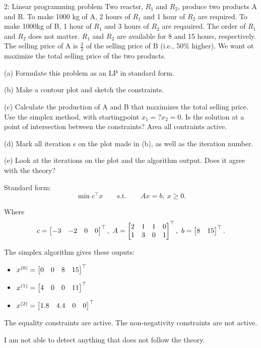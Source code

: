
\begin{problem}{2: Linear programming problem}
  Two reactsr, $R_1$ and $R_2$, produce two products A and B.
  To make 1000 kg of A, 2 hours of $R_1$ and 1 hour of $R_2$ are required. To make 1000kg of B, 1 hour of $R_1$ and 3 hours of 
  $R_2$ are reqauired. The order of $R_1$ and $R_2$ does not matter. $R_1$ and $R_2$ are available for 8 and 15 hours, respectively. 
  The selling price of A is $\frac{3}{2}$ of the selling price of B (i.e., 50\% higher). 
  We want ot maximize the total selling price of the two products. 
  
  \medskip (a) Formulate this problem as an LP in standard form. 
  
  \medskip (b) Make a contour plot and sketch the constraints.
  
  \medskip (c) Calculate the production of A and B that maximizes the total selling price. Use the simplex method, with startingpoint $x_1 = ?x_2 = 0$. 
  Is the solution at a point of intersection between the constraints? Area all contraints active.
  
  \medskip (d) Mark all iteration s on the plot made in (b), as well as the iteration number.
  
  \medskip (e) Look at the iterations on the plot and the algorithm output. Does it agree with the theory?

\end{problem}



Standard form: 
\[
  \min c^{\top}x \qquad\text{s.t.}\qquad Ax = b,\ x \geq 0
.\] 

Where
\[
  c = \begin{bmatrix} -3 & -2 & 0 & 0 \end{bmatrix}^{\top},\  A = \begin{bmatrix} 2 & 1 & 1 & 0 \\ 1 & 3 & 0 & 1 \end{bmatrix}^{\top} ,\ b = \begin{bmatrix} 8  & 15 \end{bmatrix}^{\top}
.\]
\newpage
{}

\begin{center}
\end{center}


The simplex algorithm gives these ouputs:
\begin{itemize}
  \item $x^{(0)} = \begin{bmatrix} 0 & 0 & 8 & 15 \end{bmatrix}^{\top}$
  \item $x^{(1)} = \begin{bmatrix} 4 & 0 & 0 & 11 \end{bmatrix}^{\top}$
  \item $x^{(2)} = \begin{bmatrix} 1.8 & 4.4 & 0 & 0 \end{bmatrix}^{\top}$
\end{itemize}

The equality constraints are active. The non-negativity constraints are not active. 


\begin{center}
\end{center}


I am not able to detect anything that does not follow the theory.
